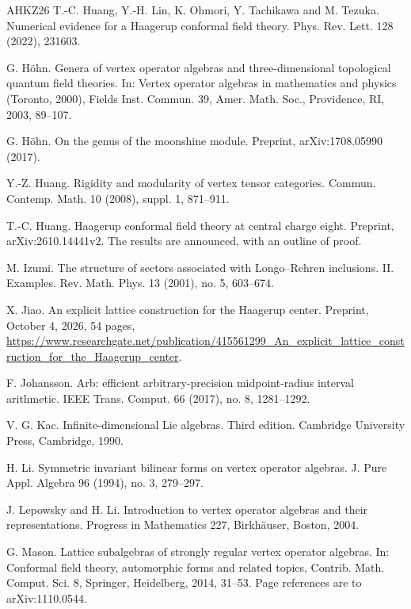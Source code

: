 \documentclass[leqno]{article}
\numberwithin{equation}{section}
\begin{document}
\begin{thebibliography}{AHKZ26}
T.-C. Huang, Y.-H. Lin, K. Ohmori, Y. Tachikawa and M. Tezuka.
\newblock Numerical evidence for a Haagerup conformal field theory.
\newblock Phys. Rev. Lett. 128 (2022), 231603.

G. Höhn.
\newblock Genera of vertex operator algebras and three-dimensional topological quantum field theories.
\newblock In: Vertex operator algebras in mathematics and physics (Toronto, 2000), Fields Inst. Commun. 39, Amer. Math. Soc., Providence, RI, 2003, 89--107.

G. Höhn.
\newblock On the genus of the moonshine module.
\newblock Preprint, arXiv:1708.05990 (2017).

Y.-Z. Huang.
\newblock Rigidity and modularity of vertex tensor categories.
\newblock Commun. Contemp. Math. 10 (2008), suppl. 1, 871--911.

T.-C. Huang.
\newblock Haagerup conformal field theory at central charge eight.
\newblock Preprint, arXiv:2610.14441v2. The results are announced, with an outline of proof.

M. Izumi.
\newblock The structure of sectors associated with Longo--Rehren inclusions. II. Examples.
\newblock Rev. Math. Phys. 13 (2001), no. 5, 603--674.

X. Jiao.
\newblock An explicit lattice construction for the Haagerup center.
\newblock Preprint, October 4, 2026, 54 pages, \url{https://www.researchgate.net/publication/415561299_An_explicit_lattice_construction_for_the_Haagerup_center}.

F. Johansson.
\newblock Arb: efficient arbitrary-precision midpoint-radius interval arithmetic.
\newblock IEEE Trans. Comput. 66 (2017), no. 8, 1281--1292.

V. G. Kac.
\newblock Infinite-dimensional Lie algebras. Third edition.
\newblock Cambridge University Press, Cambridge, 1990.

H. Li.
\newblock Symmetric invariant bilinear forms on vertex operator algebras.
\newblock J. Pure Appl. Algebra 96 (1994), no. 3, 279--297.

J. Lepowsky and H. Li.
\newblock Introduction to vertex operator algebras and their representations.
\newblock Progress in Mathematics 227, Birkhäuser, Boston, 2004.

G. Mason.
\newblock Lattice subalgebras of strongly regular vertex operator algebras.
\newblock In: Conformal field theory, automorphic forms and related topics, Contrib. Math. Comput. Sci. 8, Springer, Heidelberg, 2014, 31--53. Page references are to arXiv:1110.0544.


\end{thebibliography}
\end{document}
